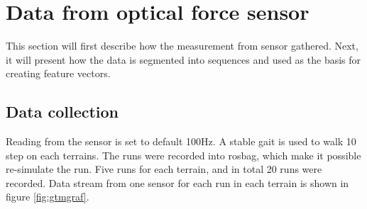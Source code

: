 \documentclass[USenglish]{ifimaster}  %
\begin{document}
\section{Data from optical force sensor}
This section will first describe how the measurement from sensor gathered. Next, it will present how the data is segmented into sequences and used as the basis for creating feature vectors.

\subsection{Data collection}
Reading from the sensor is set to default 100Hz. A stable gait is used to walk 10 step on each terrains. The runs were recorded into rosbag, which make it possible re-simulate the run. Five runs for each terrain, and in total 20 runs were recorded. Data stream from one sensor for each run in each terrain is shown in figure \ref{fig:gtmgraf}.
\end{document}
